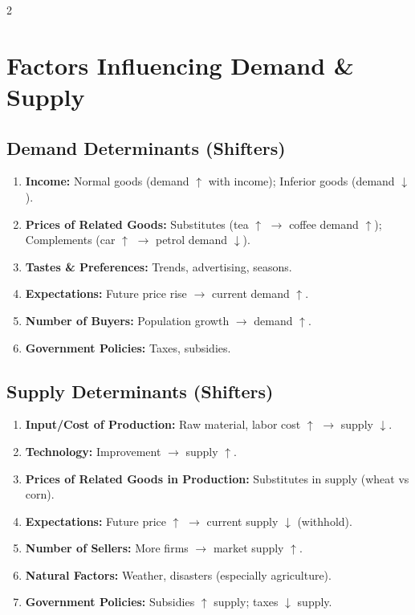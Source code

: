 \documentclass[10pt,a4paper]{article}
\begin{document}
\begin{multicols}{2}
\columnbreak

\section*{Factors Influencing Demand \& Supply}

\subsection*{Demand Determinants (Shifters)}
\begin{enumerate}[leftmargin=*,nosep]
    \item \textbf{Income:} Normal goods (demand $\uparrow$ with income); Inferior goods (demand $\downarrow$).
    \item \textbf{Prices of Related Goods:} Substitutes (tea $\uparrow$ $\to$ coffee demand $\uparrow$); Complements (car $\uparrow$ $\to$ petrol demand $\downarrow$).
    \item \textbf{Tastes \& Preferences:} Trends, advertising, seasons.
    \item \textbf{Expectations:} Future price rise $\to$ current demand $\uparrow$.
    \item \textbf{Number of Buyers:} Population growth $\to$ demand $\uparrow$.
    \item \textbf{Government Policies:} Taxes, subsidies.
\end{enumerate}

\subsection*{Supply Determinants (Shifters)}
\begin{enumerate}[leftmargin=*,nosep]
    \item \textbf{Input/Cost of Production:} Raw material, labor cost $\uparrow$ $\to$ supply $\downarrow$.
    \item \textbf{Technology:} Improvement $\to$ supply $\uparrow$.
    \item \textbf{Prices of Related Goods in Production:} Substitutes in supply (wheat vs corn).
    \item \textbf{Expectations:} Future price $\uparrow$ $\to$ current supply $\downarrow$ (withhold).
    \item \textbf{Number of Sellers:} More firms $\to$ market supply $\uparrow$.
    \item \textbf{Natural Factors:} Weather, disasters (especially agriculture).
    \item \textbf{Government Policies:} Subsidies $\uparrow$ supply; taxes $\downarrow$ supply.
\end{enumerate}


\end{multicols}
\end{document}
